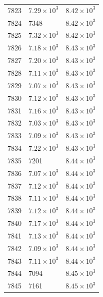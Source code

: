 \begin{table}[H]
\begin{tabular}{lll}
7823 & $\displaystyle 7.29 \times 10^{3}$ & $\displaystyle 8.42 \times 10^{3}$ \\
7824 & 7348 & $\displaystyle 8.42 \times 10^{3}$ \\
7825 & $\displaystyle 7.32 \times 10^{3}$ & $\displaystyle 8.42 \times 10^{3}$ \\
7826 & $\displaystyle 7.18 \times 10^{3}$ & $\displaystyle 8.43 \times 10^{3}$ \\
7827 & $\displaystyle 7.20 \times 10^{3}$ & $\displaystyle 8.43 \times 10^{3}$ \\
7828 & $\displaystyle 7.11 \times 10^{3}$ & $\displaystyle 8.43 \times 10^{3}$ \\
7829 & $\displaystyle 7.07 \times 10^{3}$ & $\displaystyle 8.43 \times 10^{3}$ \\
7830 & $\displaystyle 7.12 \times 10^{3}$ & $\displaystyle 8.43 \times 10^{3}$ \\
7831 & $\displaystyle 7.16 \times 10^{3}$ & $\displaystyle 8.43 \times 10^{3}$ \\
7832 & $\displaystyle 7.03 \times 10^{3}$ & $\displaystyle 8.43 \times 10^{3}$ \\
7833 & $\displaystyle 7.09 \times 10^{3}$ & $\displaystyle 8.43 \times 10^{3}$ \\
7834 & $\displaystyle 7.22 \times 10^{3}$ & $\displaystyle 8.43 \times 10^{3}$ \\
7835 & 7201 & $\displaystyle 8.44 \times 10^{3}$ \\
7836 & $\displaystyle 7.07 \times 10^{3}$ & $\displaystyle 8.44 \times 10^{3}$ \\
7837 & $\displaystyle 7.12 \times 10^{3}$ & $\displaystyle 8.44 \times 10^{3}$ \\
7838 & $\displaystyle 7.11 \times 10^{3}$ & $\displaystyle 8.44 \times 10^{3}$ \\
7839 & $\displaystyle 7.12 \times 10^{3}$ & $\displaystyle 8.44 \times 10^{3}$ \\
7840 & $\displaystyle 7.17 \times 10^{3}$ & $\displaystyle 8.44 \times 10^{3}$ \\
7841 & $\displaystyle 7.13 \times 10^{3}$ & $\displaystyle 8.44 \times 10^{3}$ \\
7842 & $\displaystyle 7.09 \times 10^{3}$ & $\displaystyle 8.44 \times 10^{3}$ \\
7843 & $\displaystyle 7.11 \times 10^{3}$ & $\displaystyle 8.44 \times 10^{3}$ \\
7844 & 7094 & $\displaystyle 8.45 \times 10^{3}$ \\
7845 & 7161 & $\displaystyle 8.45 \times 10^{3}$ \\

\end{tabular}
\end{table}
